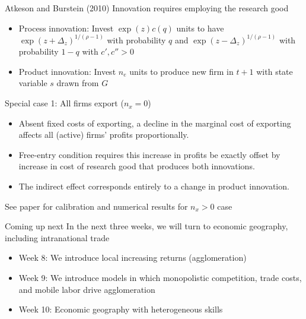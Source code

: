 \documentclass[10pt,notes=hide]{beamer}
\begin{document}
\begin{frame}{Atkeson and Burstein (2010)}
Innovation requires employing the research good
\begin{itemize}
	\item Process innovation: Invest $\exp(z)c(q)$ units to have 
	$\exp(z+\Delta_z)^{1/(\rho-1)}$ with probability $q$
	and
	$\exp(z-\Delta_z)^{1/(\rho-1)}$ with probability $1-q$
	with $c',c''>0$
	\item Product innovation: Invest $n_e$ units to produce new firm in $t+1$ with state variable $s$ drawn from $G$
\end{itemize}
Special case 1: All firms export ($n_x=0$)
\begin{itemize}
\item Absent fixed costs of exporting, a decline in the marginal cost of exporting affects all (active) firms' profits proportionally.
\item Free-entry condition requires this increase in profits be exactly offset by increase in cost of research good that produces both innovations.
\item The indirect effect corresponds entirely to a change in product innovation.
\end{itemize}
See paper for calibration and numerical results for $n_x>0$ case
\end{frame}
\begin{frame}{Coming up next}
In the next three weeks, we will turn to economic geography, including intranational trade
\begin{itemize}
\item Week 8: We introduce local increasing returns (agglomeration)
\item Week 9: We introduce models in which  monopolistic competition, trade costs, and mobile labor drive agglomeration
\item Week 10: Economic geography with heterogeneous skills
\end{itemize}
\end{frame}
\end{document}
